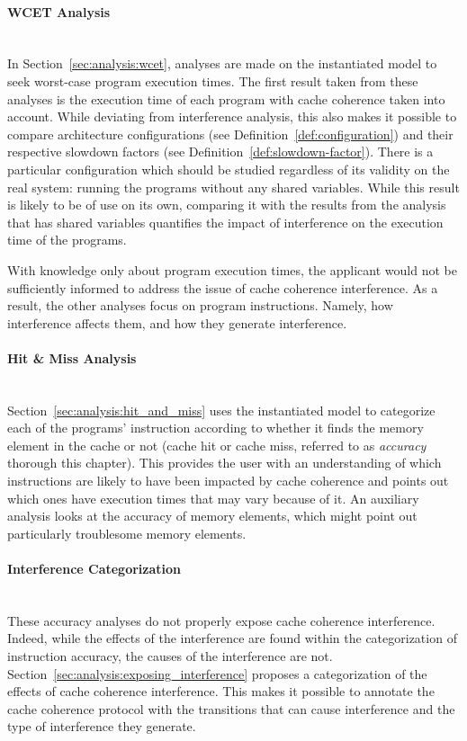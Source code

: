 \paragraph{WCET Analysis}~~\\
In Section~\ref{sec:analysis:wcet}, analyses are made on the instantiated model
to seek worst-case program execution times. The first result taken from these
analyses is the execution time of each program with cache coherence taken into
account. While deviating from interference analysis, this also makes it
possible to compare architecture configurations (see
Definition~\ref{def:configuration}) and their respective slowdown factors
(see Definition~\ref{def:slowdown-factor}).
There is a particular configuration which should be studied regardless of its
validity on the real system: running the programs without any shared variables.
While this result is likely to be of use on its own, comparing it with the
results from the analysis that has shared variables quantifies the impact of
interference on the execution time of the programs.

With knowledge only about program execution times, the applicant would not be
sufficiently informed to address the issue of cache coherence interference.
As a result, the other analyses focus on program instructions. Namely, how
interference affects them, and how they generate interference.

\paragraph{Hit \& Miss Analysis}~~\\
Section~\ref{sec:analysis:hit_and_miss} uses the instantiated model to
categorize each of the programs' instruction according to whether it finds the
memory element in the cache or not (cache hit or cache miss, referred to as
\textit{accuracy} thorough this chapter). This provides the user with an
understanding of which instructions are likely to have been impacted by cache
coherence and points out which ones have execution times that may vary because
of it. An auxiliary analysis looks at the accuracy of memory elements, which
might point out particularly troublesome memory elements.

\paragraph{Interference Categorization}~~\\
These accuracy analyses do not properly expose cache coherence interference.
Indeed, while the effects of the interference are found within the
categorization of instruction accuracy, the causes of the interference are not.
Section~\ref{sec:analysis:exposing_interference} proposes a categorization of
the effects of cache coherence interference. This makes it possible to annotate
the cache coherence protocol with the transitions that can cause interference
and the type of interference they generate.

